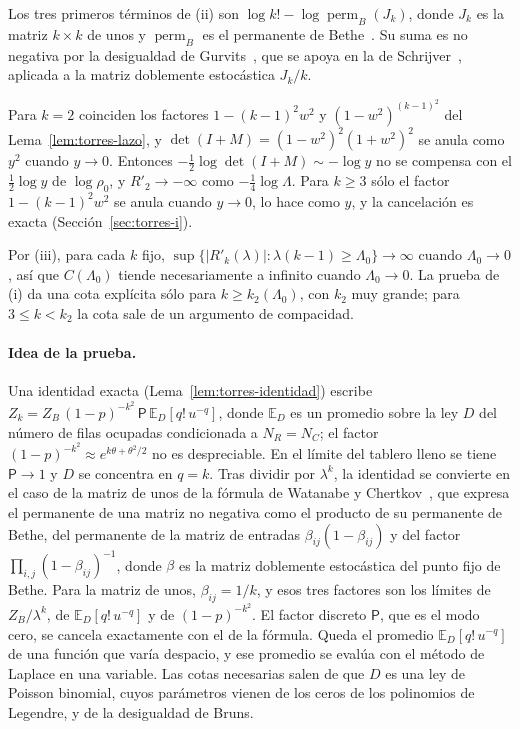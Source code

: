 Los tres primeros términos de (ii) son $\log k!-\log\operatorname{perm}_B(J_k)$, donde $J_k$ es la matriz
$k\times k$ de unos y $\operatorname{perm}_B$ es el permanente de Bethe~\cite{Vontobel}. Su suma es
no negativa por la desigualdad de Gurvits~\cite{Gurvits}, que se apoya en la de
Schrijver~\cite{Schrijver}, aplicada a la matriz doblemente estocástica $J_k/k$.

\begin{observacion}
Para $k=2$ coinciden los factores $1-(k-1)^2w^2$ y $(1-w^2)^{(k-1)^2}$ del Lema~\ref{lem:torres-lazo}, y
$\det(I+M)=(1-w^2)^2(1+w^2)^2$ se anula como $y^2$ cuando $y\to0$. Entonces
$-\frac12\log\det(I+M)\sim-\log y$ no se compensa con el $\frac12\log y$ de $\log\rho_0$, y $R'_2\to-\infty$
como $-\frac14\log\Lambda$. Para $k\ge3$ sólo el factor $1-(k-1)^2w^2$ se anula cuando $y\to0$, lo hace
como $y$, y la cancelación es exacta (Sección~\ref{sec:torres-i}).
\end{observacion}

\begin{observacion}
Por (iii), para cada $k$ fijo, $\sup\{|R'_k(\lambda)|:\lambda(k-1)\ge\Lambda_0\}\to\infty$ cuando
$\Lambda_0\to0$, así que $C(\Lambda_0)$ tiende necesariamente a infinito cuando $\Lambda_0\to0$. La prueba
de (i) da una
cota explícita sólo para $k\ge k_2(\Lambda_0)$, con $k_2$ muy grande; para $3\le k<k_2$ la cota sale de un
argumento de compacidad.
\end{observacion}

\paragraph{Idea de la prueba.}
Una identidad exacta (Lema~\ref{lem:torres-identidad}) escribe
$Z_k=Z_B\,(1-p)^{-k^2}\,\mathsf P\,\mathbb E_D[q!\,u^{-q}]$, donde $\mathbb E_D$ es un promedio sobre la ley
$D$ del número de filas ocupadas condicionada a $N_R=N_C$; el factor
$(1-p)^{-k^2}\approx e^{k\theta+\theta^2/2}$ no es despreciable. En el límite del tablero lleno se
tiene $\mathsf P\to1$ y $D$ se concentra en $q=k$. Tras dividir por $\lambda^k$, la identidad se
convierte en el caso de la matriz de unos de la fórmula de Watanabe y Chertkov~\cite{WC}, que expresa
el permanente de una matriz no negativa como el producto de su permanente de Bethe, del permanente de
la matriz de entradas $\beta_{ij}(1-\beta_{ij})$ y del factor $\prod_{i,j}(1-\beta_{ij})^{-1}$, donde
$\beta$ es la matriz doblemente estocástica del punto fijo de Bethe. Para la matriz de unos,
$\beta_{ij}=1/k$, y esos tres factores son los límites de $Z_B/\lambda^k$, de
$\mathbb E_D[q!\,u^{-q}]$ y de $(1-p)^{-k^2}$. El factor discreto $\mathsf P$, que es el
modo cero, se cancela exactamente con el de la fórmula. Queda el promedio $\mathbb E_D[q!\,u^{-q}]$ de una
función que varía despacio, y ese promedio se evalúa con el método de Laplace en una variable. Las cotas
necesarias salen de que $D$ es una ley de Poisson binomial, cuyos parámetros vienen de los ceros de los
polinomios de Legendre, y de la desigualdad de Bruns.
